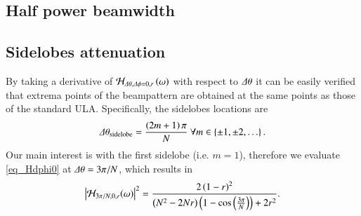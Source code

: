 \subsection*{Half power beamwidth}

\subsection*{Sidelobes attenuation}
\ifdefined\showDev
\else
\fi
By taking a derivative of $\mathcal{H}_{\Delta\theta,\Delta\phi=0,r}\left({\omega}\right)$  with respect to $\Delta\theta$ it can be easily verified that extrema points of the beampattern are obtained at the same points as those of the standard ULA. Specifically, the sidelobes locations are
\begin{equation}
    \label{eqn_CB_sidelobesLocations}
    \dTheta_{\text{sidelobe}} = \frac{\rBrace{2m+1}\pi}{N}\ \forall m\in\cBrace{\pm 1,\pm 2,\hdots}.
\end{equation}
Our main interest is with the first sidelobe (i.e. $m=1$), therefore we evaluate \eqref{eq_Hdphi0} at $\Delta\theta = 3\pi/N$, which results in
\begin{equation}
    \abs{\Hr_{{3\pi}/{N},0,r}(\omega)}^2
    =
    \frac{
    2\rBrace{1-r}^{2}
    }{
    \rBrace{N^{2}-2Nr}\rBrace{1-\cos{\rBrace{\frac{3\pi}{N}}}}+2r^{2}
    }.
    \label{eq_HSidelobes}
\end{equation}
